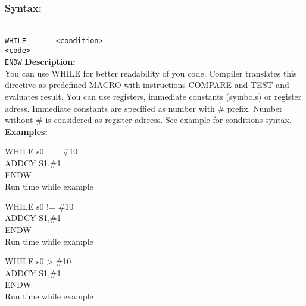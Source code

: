         \subsubsection{Syntax:}
        {
            ~\\
            \usecodefont
            \verb'WHILE       <condition>'\\
            \verb'<code>'\\
            \verb'ENDW'
        }
        \textbf{Description:}\\
        You can use WHILE for better readability of you code. Compiler translates this directive as predefined MACRO with instructions COMPARE and TEST and
        evaluates result. You can use registers, immediate constants (symbols) or register adress. Immediate constants are specified as number with \# prefix.
        Number without \# is considered as register adrress. See example for conditions syntax.
        \textbf{Examples:}\\
                \begin{code}[h!]
                        { \color{highlight_directive} WHILE  }
                        { \color{highlight_constant}   s0 == \#10 }\\
                        { \color{highlight_instruction} ADDCY    S1,\#1 }\\
                        { \color{highlight_directive}  ENDW}\\
                    \caption{Run time while example}
                \end{code}
                \begin{code}[h!]
                        { \color{highlight_directive} WHILE  }
                        { \color{highlight_constant}   s0  != \#10 }\\
                        { \color{highlight_instruction} ADDCY    S1,\#1 }\\
                        { \color{highlight_directive}  ENDW}\\
                    \caption{Run time while example}
                \end{code}
                \begin{code}[h!]
                        { \color{highlight_directive} WHILE  }
                        { \color{highlight_constant}   s0 >    \#10 }\\
                        { \color{highlight_instruction} ADDCY    S1,\#1 }\\
                        { \color{highlight_directive}  ENDW}\\
                    \caption{Run time while example}
                \end{code}
